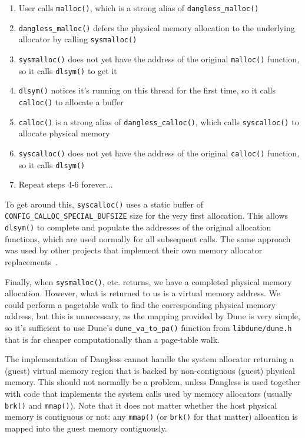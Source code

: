 \begin{enumerate}
	\item User calls \lstinline!malloc()!, which is a strong alias of \lstinline!dangless_malloc()!
	\item \lstinline!dangless_malloc()! defers the physical memory allocation to the underlying allocator by calling \lstinline!sysmalloc()!
	\item \lstinline!sysmalloc()! does not yet have the address of the original \lstinline!malloc()! function, so it calls \lstinline!dlsym()! to get it
	\item \lstinline!dlsym()! notices it's running on this thread for the first time, so it calls \lstinline!calloc()! to allocate a buffer
	\item \lstinline!calloc()! is a strong alias of \lstinline!dangless_calloc()!, which calls \lstinline!syscalloc()! to allocate physical memory
	\item \lstinline!syscalloc()! does not yet have the address of the original \lstinline!calloc()! function, so it calls \lstinline!dlsym()!
	\item Repeat steps 4-6 forever...
\end{enumerate}

To get around this, \lstinline!syscalloc()! uses a static buffer of \lstinline!CONFIG_CALLOC_SPECIAL_BUFSIZE! size for the very first allocation. This allows \lstinline!dlsym()! to complete and populate the addresses of the original allocation functions, which are used normally for all subsequent calls. The same approach was used by other projects that implement their own memory allocator replacements~\cite{dlsym-calloc-special-ex1}.

Finally, when \lstinline!sysmalloc()!, etc. returns, we have a completed physical memory allocation. However, what is returned to us is a virtual memory address. We could perform a pagetable walk to find the corresponding physical memory address, but this is unnecessary, as the mapping provided by Dune is very simple, so it's sufficient to use Dune's \lstinline!dune_va_to_pa()! function from \texttt{libdune/dune.h} that is far cheaper computationally than a page-table walk.

The implementation of Dangless cannot handle the system allocator returning a (guest) virtual memory region that is backed by non-contiguous (guest) physical memory. This should not normally be a problem, unless Dangless is used together with code that implements the system calls used by memory allocators (usually \lstinline!brk()! and \lstinline!mmap()!).
Note that it does not matter whether the host physical memory is contiguous or not: any \lstinline!mmap()! (or \lstinline!brk()! for that matter) allocation is mapped into the guest memory contiguously. 

